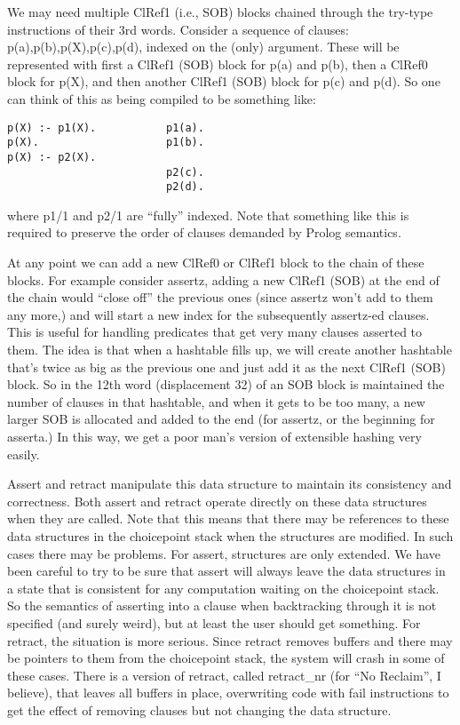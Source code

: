 \documentclass[11pt]{article}
\begin{document}
We may need multiple ClRef1 (i.e., SOB) blocks chained through the
try-type instructions of their 3rd words.  Consider a sequence of
clauses: p(a),p(b),p(X),p(c),p(d), indexed on the (only) argument.
These will be represented with first a ClRef1 (SOB) block for p(a) and
p(b), then a ClRef0 block for p(X), and then another ClRef1 (SOB)
block for p(c) and p(d).  So one can think of this as being compiled
to be something like:
\begin{verbatim}
p(X) :- p1(X).           p1(a).
p(X).                    p1(b).
p(X) :- p2(X).
                         p2(c).
                         p2(d).
\end{verbatim}
where p1/1 and p2/1 are ``fully'' indexed.  Note that something like
this is required to preserve the order of clauses demanded by Prolog
semantics.

At any point we can add a new ClRef0 or ClRef1 block to the chain of
these blocks.  For example consider assertz, adding a new ClRef1 (SOB)
at the end of the chain would ``close off'' the previous ones (since
assertz won't add to them any more,) and will start a new index for the
subsequently assertz-ed clauses.  This is useful for handling
predicates that get very many clauses asserted to them.  The idea is
that when a hashtable fills up, we will create another hashtable
that's twice as big as the previous one and just add it as the next
ClRef1 (SOB) block.  So in the 12th word (displacement 32) of an SOB
block is maintained the number of clauses in that hashtable, and when
it gets to be too many, a new larger SOB is allocated and added to the
end (for assertz, or the beginning for asserta.)  In this way, we get
a poor man's version of extensible hashing very easily.

Assert and retract manipulate this data structure to maintain its
consistency and correctness.  Both assert and retract operate directly
on these data structures when they are called.  Note that this means
that there may be references to these data structures in the
choicepoint stack when the structures are modified.  In such cases
there may be problems.  For assert, structures are only extended.  We
have been careful to try to be sure that assert will always leave the
data structures in a state that is consistent for any computation
waiting on the choicepoint stack.  So the semantics of asserting into
a clause when backtracking through it is not specified (and surely
weird), but at least the user should get something.  For retract, the
situation is more serious.  Since retract removes buffers and there
may be pointers to them from the choicepoint stack, the system will
crash in some of these cases.  There is a version of retract, called
retract\_nr (for ``No Reclaim'', I believe), that leaves all buffers in
place, overwriting code with fail instructions to get the effect of
removing clauses but not changing the data structure.
\end{document}

